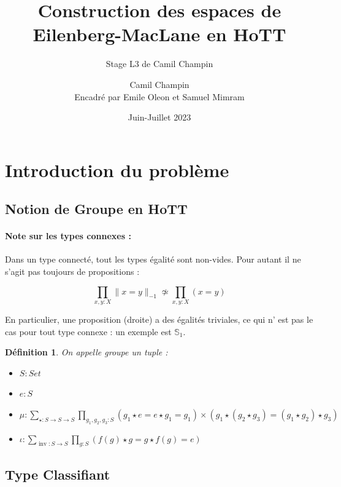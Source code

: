 \documentclass{article}
\title{Construction des espaces de Eilenberg-MacLane en HoTT}
\author{Stage L3 de Camil Champin}
\author{Camil Champin\\[1ex]
\small Encadré par Emile Oleon et Samuel Mimram}  %
\date{Juin-Juillet 2023}
\DeclareMathOperator{\inv}{inv}
\newtheorem{definition}{Définition}[section]
\begin{document}
\maketitle

\section{Introduction du problème}

%


\subsection{Notion de Groupe en HoTT}

\paragraph{Note sur les types connexes :} Dans un type connecté, tout les types égalité sont non-vides. Pour autant il ne s'agit pas toujours de propositions :

\[\prod_{x,y : X} \|x = y\|_{-1} \not\simeq \prod_{x,y : X} (x = y)\]

En particulier, une proposition (droite) a des égalités triviales, ce qui n' est pas le cas pour tout type connexe : un exemple est $\mathbb{S}_{1}$.

\begin{definition}

On appelle \emph{groupe} un tuple :

\begin{itemize}
        \item $S : Set$
        \item $e : S$
        \item $\mu : \displaystyle\sum_{\star : S \to S \to S} \displaystyle\prod_{g_1,g_2, g_3 : S} (g_1 \star e = e \star g_1 = g_1 ) \times (g_1 \star (g_2 \star g_3) = (g_1 \star g_2) \star g_3) $
        \item $\iota : \displaystyle\sum_{\inv : S \to S} \displaystyle\prod_{g : S} (f(g) \star g = g \star f(g) = e)$
\end{itemize}

\end{definition}


\subsection{Type Classifiant}
\end{document}
